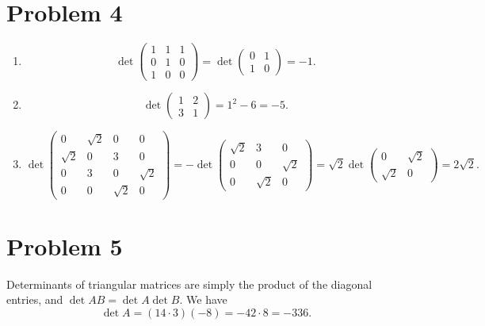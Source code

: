 \documentclass[11pt, letterpaper]{article}
\begin{document}
\section*{Problem 4}
\begin{enumerate}
	\item 
		\[
			\det \begin{pmatrix}
			1 & 1 & 1 \\
			0 & 1 & 0 \\
			1 & 0 & 0
			\end{pmatrix}=\det \begin{pmatrix}
			0 & 1 \\
			1 & 0
			\end{pmatrix}=-1
		.\]
	\item 
		\[
			\det \begin{pmatrix}
			1 & 2 \\
			3 & 1
			\end{pmatrix}=1^2-6=-5
		.\]
	\item 
		\[
			\det \begin{pmatrix}
			0 & \sqrt{2}  & 0 & 0 \\
			\sqrt{2}  & 0 & 3 & 0 \\
			0 & 3 & 0 & \sqrt{2}  \\
			0 & 0 & \sqrt{2}  & 0
			\end{pmatrix}=-\det \begin{pmatrix}
			\sqrt{2}  & 3 & 0 \\
			0 & 0 & \sqrt{2}  \\
			0 & \sqrt{2}  & 0
			\end{pmatrix}=\sqrt{2} \det \begin{pmatrix}
			0 & \sqrt{2}  \\
			\sqrt{2}  & 0
			\end{pmatrix}=2\sqrt{2} 
		.\]
\end{enumerate}

\section*{Problem 5}
Determinants of triangular matrices are simply the product of the diagonal entries, and $\det AB=\det A \det B$. We have
\[
	\det A=\left( 14\cdot 3 \right) \left( -8 \right) =-42\cdot 8=-336
.\]
\end{document}
